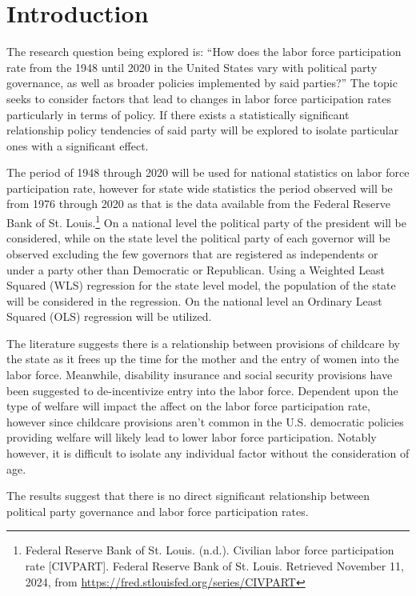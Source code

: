 \chapter{Introduction}

The research question being explored is: ``How does the labor force participation rate from the 1948 until 2020 in the United States vary with political party governance, as well as broader policies implemented by said parties?'' The topic seeks to consider factors that lead to changes in labor force participation rates particularly in terms of policy. If there exists a statistically significant relationship policy tendencies of said party will be explored to isolate particular ones with a significant effect.

The period of 1948 through 2020 will be used for national statistics on labor force participation rate, however for state wide statistics the period observed will be from 1976 through 2020 as that is the data available from the Federal Reserve Bank of St. Louis.\footnote{Federal Reserve Bank of St. Louis. (n.d.). Civilian labor force participation rate [CIVPART]. Federal Reserve Bank of St. Louis. Retrieved November 11, 2024, from \href{https://fred.stlouisfed.org/series/CIVPART}{https://fred.stlouisfed.org/series/CIVPART}} On a national level the political party of the president will be considered, while on the state level the political party of each governor will be observed excluding the few governors that are registered as independents or under a party other than Democratic or Republican. Using a Weighted Least Squared (WLS) regression for the state level model, the population of the state will be considered in the regression. On the national level an Ordinary Least Squared (OLS) regression will be utilized.

The literature suggests there is a relationship between provisions of childcare by the state as it frees up the time for the mother and the entry of women into the labor force. Meanwhile, disability insurance and social security provisions have been suggested to de-incentivize entry into the labor force. Dependent upon the type of welfare will impact the affect on the labor force participation rate, however since childcare provisions aren't common in the U.S. democratic policies providing welfare will likely lead to lower labor force participation. Notably however, it is difficult to isolate any individual factor without the consideration of age.

The results suggest that there is no direct significant relationship between political party governance and labor force participation rates.